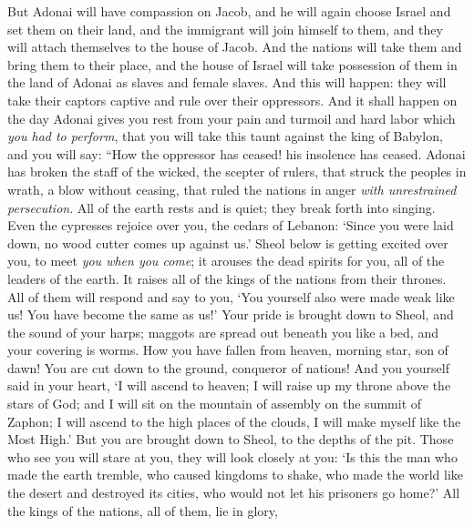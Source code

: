 \begin{biblechapter} %
 But Adonai will have compassion on Jacob, 
and he will again choose Israel 
and set them on their land, 
and the immigrant will join himself to them, 
and they will attach themselves to the house of Jacob.
\verse And the nations will take them 
and bring them to their place, 
and the house of Israel will take possession of them in the land of Adonai 
as slaves and female slaves. And this will happen: they will take their captors captive 
and rule over their oppressors.
 And it shall happen on the day Adonai gives you rest from your pain and turmoil and hard labor which \textit{you had to perform},
\verse that you will take this taunt against the king of Babylon, 
and you will say: 
“How the oppressor has ceased! 
his insolence has ceased.
\verse Adonai has broken the staff of the wicked, 
the scepter of rulers,
\verse that struck the peoples in wrath, a blow without ceasing, 
that ruled the nations in anger 
\textit{with unrestrained persecution}.
\verse All of the earth rests and is quiet; 
they break forth into singing.
\verse Even the cypresses rejoice over you, 
the cedars of Lebanon: 
‘Since you were laid down, 
no wood cutter comes up against us.’
\verse Sheol below is getting excited over you, 
to meet \textit{you when you come}; 
it arouses the dead spirits for you, 
all of the leaders of the earth. 
It raises all of the kings of the nations from their thrones.
\verse All of them will respond and say to you, 
‘You yourself also were made weak like us! 
You have become the same as us!’
\verse Your pride is brought down to Sheol, 
and the sound of your harps; 
maggots are spread out beneath you like a bed, 
and your covering is worms.
\verse How you have fallen from heaven, morning star, son of dawn! 
You are cut down to the ground, conqueror of nations!
\verse And you yourself said in your heart,
\verse ‘I will ascend to heaven; 
I will raise up my throne above the stars of God; 
and I will sit on the mountain of assembly 
on the summit of Zaphon;
\verse I will ascend to the high places of the clouds, 
I will make myself like the Most High.’
\verse But you are brought down to Sheol, 
to the depths of the pit.
\verse Those who see you will stare at you, 
they will look closely at you: 
‘Is this the man who made the earth tremble, 
who caused kingdoms to shake,
\verse who made the world like the desert 
and destroyed its cities, 
who would not let his prisoners go home?’
\verse All the kings of the nations, all of them, lie in glory, 

\end{biblechapter}
